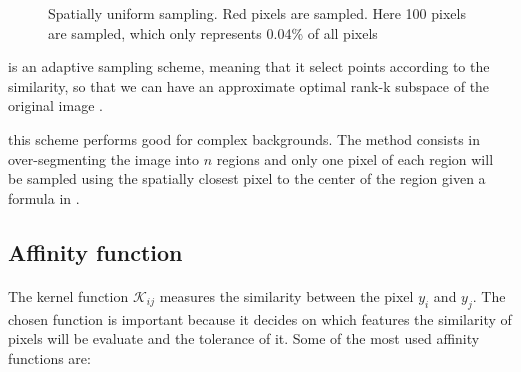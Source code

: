 \begin{description}[align=left]
\begin{figure}[H]
      \caption{Spatially uniform sampling. Red pixels are sampled. Here 100 pixels are sampled, which only represents 0.04\% of all pixels}
  \end{figure}
 \item [Incremental sampling (INS)] is an adaptive sampling scheme, meaning that it select points according to the similarity, so that we can have an approximate optimal rank-k subspace of the original image \cite{zhan_improved_2017}.
 \item [Mean-shift segmentation-based sampling] this scheme performs good for complex backgrounds. The method consists in over-segmenting the image into \(n\) regions and only one pixel of each region will be sampled using the spatially closest pixel to the center of the region given a formula in \cite{kao_sampling_2012}.
\end{description}

\subsection{Affinity function}

\paragraph{}
The kernel function \(\mathcal{K}_{ij}\) measures the similarity between the pixel \(y_i\) and \(y_j\).
The chosen function is important because it decides on which features the similarity of pixels will be evaluate and the tolerance of it.
Some of the most used affinity functions are:

